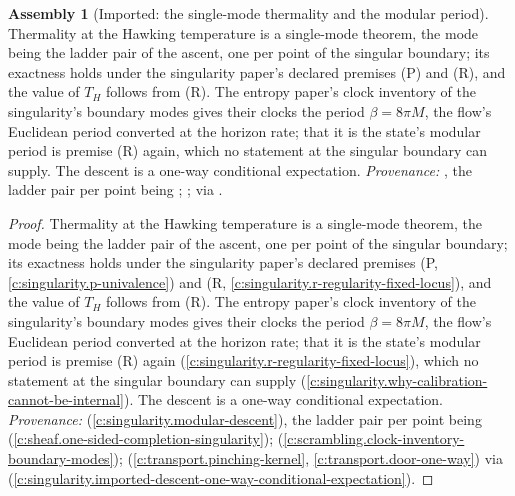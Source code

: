 \documentclass[11pt]{article}
\theoremstyle{definition}
\newtheorem{assembled}[theorem]{Assembly}
\theoremstyle{plain}
\newcommand{\changedmark}[2]{\marginpar{\raggedright\scriptsize\color{#1}#2}}
\begin{document}
\begin{assembled}[Imported: the single-mode thermality and the modular period]\label{c:one-relation.imported-single-mode-thermality-modular-period}
\changedmark{BrickRed}{corrected since the deposit}
Thermality at the Hawking temperature is a single-mode theorem, the mode being the ladder pair of the ascent, one per point of the singular boundary; its exactness holds under the singularity paper's declared premises (P) and (R), and the value of $T_{H}$ follows from (R). The entropy paper's clock inventory of the singularity's boundary modes gives their clocks the period $\beta = 8\pi M$, the flow's Euclidean period converted at the horizon rate; that it is the state's modular period is premise (R) again, which no statement at the singular boundary can supply. The descent is a one-way conditional expectation. \emph{Provenance:} \cite[Thm.~7.3, Rem.~7.33]{ButlerT5}, the ladder pair per point being \cite[Thm.~8.12]{ButlerT4}; \cite[Lem.~4.2]{ButlerT8}; \cite[Prop.~7.5, Thm.~7.6]{ButlerT1} via \cite[Fact~5.9]{ButlerT5}.
\end{assembled}
\begin{proof}
Thermality at the Hawking temperature is a single-mode theorem, the mode being the ladder pair of the ascent, one per point of the singular boundary; its exactness holds under the singularity paper's declared premises (P, \ref{c:singularity.p-univalence}) and (R, \ref{c:singularity.r-regularity-fixed-locus}), and the value of $T_{H}$ follows from (R). The entropy paper's clock inventory of the singularity's boundary modes gives their clocks the period $\beta = 8\pi M$, the flow's Euclidean period converted at the horizon rate; that it is the state's modular period is premise (R) again (\ref{c:singularity.r-regularity-fixed-locus}), which no statement at the singular boundary can supply (\ref{c:singularity.why-calibration-cannot-be-internal}). The descent is a one-way conditional expectation. \emph{Provenance:} \cite[Thm.~7.3, Rem.~7.33]{ButlerT5} (\ref{c:singularity.modular-descent}), the ladder pair per point being \cite[Thm.~8.12]{ButlerT4} (\ref{c:sheaf.one-sided-completion-singularity}); \cite[Lem.~4.2]{ButlerT8} (\ref{c:scrambling.clock-inventory-boundary-modes}); \cite[Prop.~7.5, Thm.~7.6]{ButlerT1} (\ref{c:transport.pinching-kernel}, \ref{c:transport.door-one-way}) via \cite[Fact~5.9]{ButlerT5} (\ref{c:singularity.imported-descent-one-way-conditional-expectation}).

\end{proof}
\end{document}
